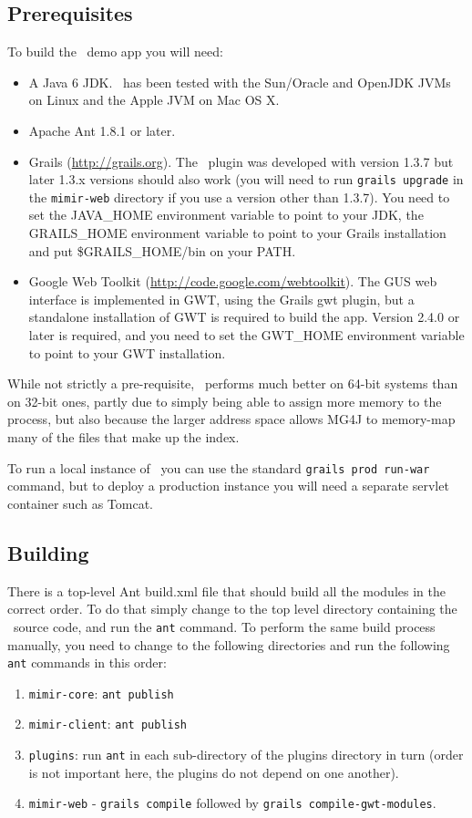 \subsection{Prerequisites}

To build the \Mimir\ demo app you will need:
\begin{itemize}
\item A Java 6 JDK.  \Mimir\ has been tested with the Sun/Oracle and OpenJDK
  JVMs on Linux and the Apple JVM on Mac OS X.
\item Apache Ant 1.8.1 or later.
\item Grails (\url{http://grails.org}).  The \Mimir\ plugin was developed with
version 1.3.7 but later 1.3.x versions should also work (you will need to run
{\tt grails upgrade} in the {\tt mimir-web} directory if you use a version other
than 1.3.7).  You need to set the JAVA\_HOME environment variable to point to
your JDK, the GRAILS\_HOME environment variable to point to your Grails
installation and put \$GRAILS\_HOME/bin on your PATH. 
\item Google Web Toolkit (\url{http://code.google.com/webtoolkit}).  The GUS
  web interface is implemented in GWT, using the Grails gwt plugin, but a
  standalone installation of GWT is required to build the app.  Version 2.4.0
  or later is required, and you need to set the GWT\_HOME environment
  variable to point to your GWT installation.
\end{itemize}

While not strictly a pre-requisite, \Mimir\ performs much better on 64-bit
systems than on 32-bit ones, partly due to simply being able to assign more
memory to the process, but also because the larger address space allows MG4J to
memory-map many of the files that make up the index.

To run a local instance of \Mimir\ you can use the standard {\tt grails prod
run-war} command, but to deploy a production instance you will need a separate
servlet container such as Tomcat.

\subsection{Building}

There is a top-level Ant build.xml file that should build all the modules in
the correct order. To do that simply change to the top level directory
containing the \Mimir\ source code, and run the {\tt ant} command. To perform
the same build process manually, you need to change to the following directories
and run the following {\tt ant} commands in this order:
\begin{enumerate}
\item {\tt mimir-core}: {\tt ant publish}
\item {\tt mimir-client}: {\tt ant publish}
\item {\tt plugins}: run {\tt ant} in each sub-directory of the plugins
  directory in turn (order is not important here, the plugins do not depend on
  one another).
\item {\tt mimir-web} - {\tt grails compile} followed by {\tt grails
  compile-gwt-modules}.
\end{enumerate}

